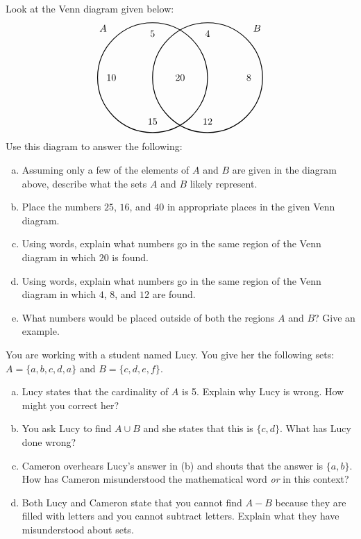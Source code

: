 \documentclass[11pt,letterpaper]{article}
\begin{document}
 Look at the Venn diagram given below:
	\[
	\begin{tikzpicture}
	\draw[line width=0.03cm] (-1,0) circle (2);
	\draw[line width=0.03cm] (1,0) circle (2);
	\node at (-2.8,1.8) {$A$}; 
	\node at (-1,1.6) {$5$}; \node at (-2.5,0) {$10$}; \node at (-1,-1.6) {$15$};
	\node at (2.8,1.8) {$B$};
	\node at (1,1.6) {$4$}; \node at (2.5,0) {$8$}; \node at (1,-1.6) {$12$};
	\node at (0,0) {$20$};
	\end{tikzpicture}
	\]
Use this diagram to answer the following:
	\begin{enumerate}[(a)]
	\item Assuming only a few of the elements of $A$ and $B$ are given in the diagram above, describe what the sets $A$ and $B$ likely represent.
	\item Place the numbers $25$, $16$, and $40$ in appropriate places in the given Venn diagram. 
	\item Using words, explain what numbers go in the same region of the Venn diagram in which $20$ is found.
	\item Using words, explain what numbers go in the same region of the Venn diagram in which $4$, $8$, and $12$ are found.
	\item What numbers would be placed outside of both the regions $A$ and $B$? Give an example.  
	\end{enumerate}



\newpage



 You are working with a student named Lucy. You give her the following sets: $A= \{ a, b, c, d, a \}$ and $B= \{ c, d, e, f \}$. 
	\begin{enumerate}[(a)]
	\item Lucy states that the cardinality of $A$ is 5. Explain why Lucy is wrong. How might you correct her?
	\item You ask Lucy to find $A \cup B$ and she states that this is $\{ c, d \}$. What has Lucy done wrong?
	\item Cameron overhears Lucy's answer in (b) and shouts that the answer is $\{ a, b \}$. How has Cameron misunderstood the mathematical word \textit{or} in this context? 
	\item Both Lucy and Cameron state that you cannot find $A - B$ because they are filled with letters and you cannot subtract letters. Explain what they have misunderstood about sets. 
	\end{enumerate}
\end{document}
